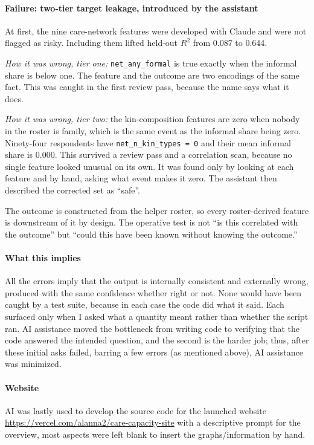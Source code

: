 \documentclass[9pt,twoside]{pnas-new}
\begin{document}
\paragraph{Failure: two-tier target leakage, introduced by the assistant} At first, the
nine care-network features were developed with Claude and were not flagged as risky. Including them lifted held-out $R^2$ from 0.087 to
0.644.

\emph{How it was wrong, tier one:} \texttt{net\_any\_formal} is true exactly
when the informal share is below one. The feature and the outcome are two
encodings of the same fact. This was caught in the first review pass, because
the name says what it does.

\emph{How it was wrong, tier two:} the kin-composition features are zero
when nobody in the roster is family, which is the same event as the informal
share being zero. Ninety-four respondents have \texttt{net\_n\_kin\_types = 0}
and their mean informal share is 0.000. This survived a review pass and
a correlation scan, because no single feature looked unusual on its own. It was
found only by looking at each feature and by hand, asking what event makes it zero. The assistant
then described the corrected set as ``safe''.

The outcome is
constructed from the helper roster, so every roster-derived feature is
downstream of it by design. The operative test is not ``is this correlated with
the outcome'' but ``could this have been known without knowing the outcome.''

\paragraph{What this implies} All the errors imply that the output is internally
consistent and externally wrong, produced with the same confidence whether right
or not. None would have been caught by a test suite, because in each case the
code did what it said. Each surfaced only when I asked what a quantity
meant rather than whether the script ran. AI assistance moved the
bottleneck from writing code to verifying that the code answered the intended
question, and the second is the harder job; thus, after these initial asks failed, barring a few errors (as mentioned above), AI assistance was minimized.

\paragraph{Website} AI was lastly used to develop the source code for the launched website \url{https://vercel.com/alanna2/care-capacity-site} with a descriptive prompt for the overview, most aspects were left blank to insert the graphs/information by hand.
\end{document}
